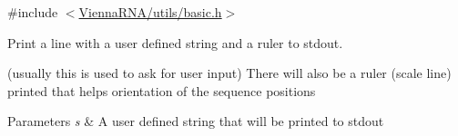 {\ttfamily \#include $<$\mbox{\hyperlink{utils_2basic_8h}{Vienna\+R\+N\+A/utils/basic.\+h}}$>$}



Print a line with a user defined string and a ruler to stdout. 

(usually this is used to ask for user input) There will also be a ruler (scale line) printed that helps orientation of the sequence positions


\begin{DoxyParams}{Parameters}
{\em s} & A user defined string that will be printed to stdout \\
\hline
\end{DoxyParams}

